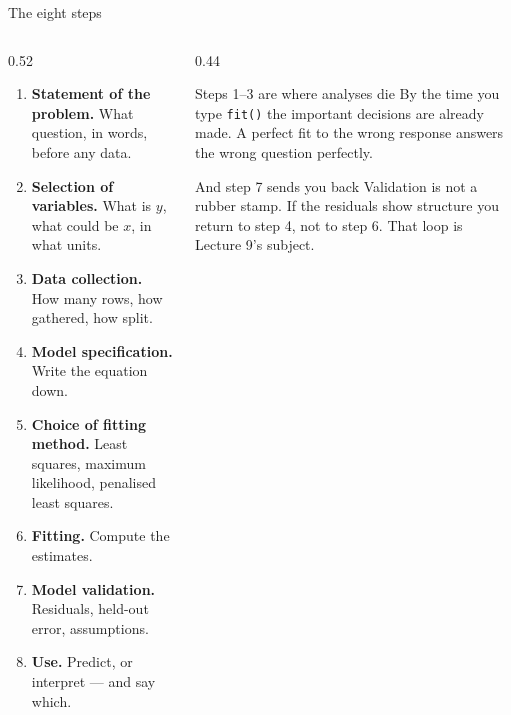 \documentclass[aspectratio=169]{beamer}
\begin{document}
\begin{frame}[shrink=7]{The eight steps}
  \begin{columns}[T]
    \begin{column}{0.52\textwidth}
      \begin{enumerate}\small
        \item \textbf{Statement of the problem.} What question, in words,
          before any data.
        \item \textbf{Selection of variables.} What is $y$, what could be
          $x$, in what units.
        \item \textbf{Data collection.} How many rows, how gathered, how
          split.
        \item \textbf{Model specification.} Write the equation down.
        \item \textbf{Choice of fitting method.} Least squares, maximum
          likelihood, penalised least squares.
        \item \textbf{Fitting.} Compute the estimates.
        \item \textbf{Model validation.} Residuals, held-out error,
          assumptions.
        \item \textbf{Use.} Predict, or interpret --- and say which.
      \end{enumerate}
    \end{column}
    \begin{column}{0.44\textwidth}
      \begin{alertblock}{Steps 1--3 are where analyses die}
        \small By the time you type \texttt{fit()} the important decisions
        are already made. A perfect fit to the wrong response answers the
        wrong question perfectly.
      \end{alertblock}
      \begin{block}{And step 7 sends you back}
        \small Validation is not a rubber stamp. If the residuals show
        structure you return to step 4, not to step 6. That loop is
        Lecture 9's subject.
      \end{block}
    \end{column}
  \end{columns}
\end{frame}
\end{document}
